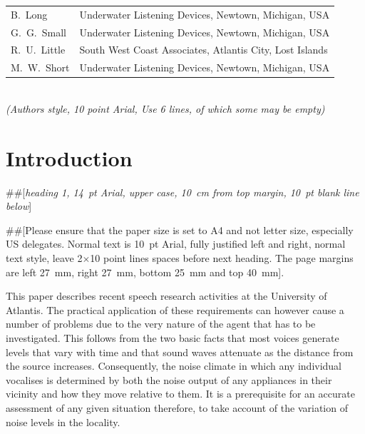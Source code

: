 \documentclass[10pt, a4paper, oneside]{article}
\newcommand{\AuthorsTable}{
\noindent \hspace{-3mm}
\begin{tabular}{L{2.6cm} l}
							B.~Long & Underwater Listening Devices, Newtown, Michigan, USA\\[1.2pt] 
							G.~G.~Small &  Underwater Listening Devices, Newtown, Michigan, USA\\[1.2pt] 
              R.~U.~Little & South West Coast Associates, Atlantis City, Lost Islands\\[1.2pt] 
							M.~W.~Short & Underwater Listening Devices, Newtown, Michigan, USA\\[1.2pt] 
\end{tabular}\\
\textit{(Authors style, 10 point Arial, Use 6 lines, of which some may be empty)}
}
\begin{document}
 \setcounter{page}{1} \pagestyle{plain}
{\fontsize{16}{18.5}\selectfont\bfseries \MakeUppercase \CompleteTitlePaper \par}
\AuthorsTable \vspace{0.2\baselineskip} %
\fontsize{10}{11}\selectfont 
\section{Introduction}

\#\#[\textit{heading 1, 14~pt Arial, upper case, 10~cm from top margin, 10~pt blank line below}]

\#\#[Please ensure that the paper size is set to A4 and not letter size, especially US delegates. Normal text is 10~pt Arial, fully justified left and right, normal text style, leave 2$\times$10 point lines spaces before next heading. The page margins are left 27~mm, right 27~mm, bottom 25~mm and top 40~mm]. 

This paper describes recent speech research activities at the University of Atlantis. The practical application of these requirements can however cause a number of problems due to the very nature of the agent that has to be investigated. This follows from the two basic facts that most voices generate levels that vary with time and that sound waves attenuate as the distance from the source increases. Consequently, the noise climate in which any individual vocalises is determined by both the noise output of any appliances in their vicinity and how they move relative to them. It is a prerequisite for an accurate assessment of any given situation therefore, to take account of the variation of noise levels in the locality.
\end{document}
